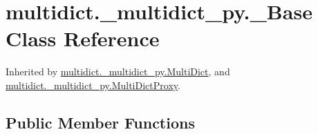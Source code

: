 \hypertarget{classmultidict_1_1__multidict__py_1_1___base}{}\section{multidict.\+\_\+multidict\+\_\+py.\+\_\+\+Base Class Reference}
\label{classmultidict_1_1__multidict__py_1_1___base}


Inherited by \hyperlink{classmultidict_1_1__multidict__py_1_1_multi_dict}{multidict.\+\_\+multidict\+\_\+py.\+Multi\+Dict}, and \hyperlink{classmultidict_1_1__multidict__py_1_1_multi_dict_proxy}{multidict.\+\_\+multidict\+\_\+py.\+Multi\+Dict\+Proxy}.

\subsection*{Public Member Functions}
